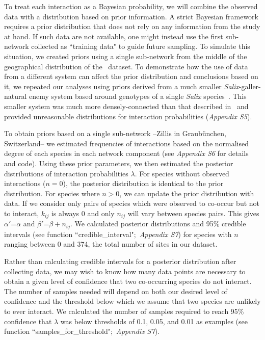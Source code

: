 \documentclass[12pt]{article}
\begin{document}
\begin{spacing}{2.0}
        To treat each interaction as a Bayesian probability, we will combine the observed data with a distribution based on prior information. A strict Bayesian framework requires a prior distribution that does not rely on any information from the study at hand. If such data are not available, one might instead use the first sub-network collected as ``training data" to guide future sampling. To simulate this situation, we created priors using a single sub-network from the middle of the geographical distribution of the~\citet{Kopelke2017} dataset. To demonstrate how the use of data from a different system can affect the prior distribution and conclusions based on it, we repeated our analyses using priors derived from a much smaller \emph{Salix}-galler-natural enemy system based around genotypes of a single \emph{Salix} species~\citep[Data available from the Dryad Digital Repository: https://doi.org/10.5061/dryad.g7805]{Barbour2016}\nocite{Barbour2016Dryad}. This smaller system was much more densely-connected than that described in~\citet{Kopelke2017} and provided unreasonable distributions for interaction probabilities (\emph{Appendix S5}). 


        To obtain priors based on a single sub-network --Zillis in Graub\"{u}nchen, Switzerland-- we estimated frequencies of interactions based on the normalised degree of each species in each network component (see \emph{Appendix S6} for details and code). Using these prior parameters, we then estimated the posterior distributions of interaction probabilities $\lambda$. For species without observed interactions ($n = 0$), the posterior distribution is identical to the prior distribution. For species where $n>0$, we can update the prior distribution with data. If we consider only pairs of species which were observed to co-occur but not to interact, $k_{ij}$ is always 0 and only $n_{ij}$ will vary between species pairs. This gives $\alpha'$=$\alpha$ and $\beta'$=$\beta + n_{ij}$. We calculated posterior distributions and 95\% credible intervals (see function ``credible\_interval";~\emph{Appendix S7}) for species with $n$ ranging between 0 and 374, the total number of sites in our dataset. 


        Rather than calculating credible intervals for a posterior distribution after collecting data, we may wish to know how many data points are necessary to obtain a given level of confidence that two co-occurring species do not interact. The number of samples needed will depend on both our desired level of confidence and the threshold below which we assume that two species are unlikely to ever interact. We calculated the number of samples required to reach 95\% confidence that $\lambda$ was below thresholds of 0.1, 0.05, and 0.01 as examples (see function ``samples\_for\_threshold";~\emph{Appendix S7}).



\end{spacing}
\end{document}
